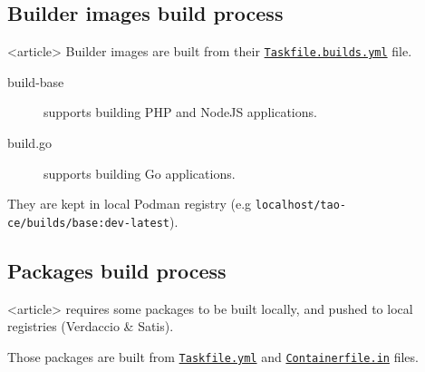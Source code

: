 \subsection<article>{Builder images build process}
\begin{frame}<article>
    Builder images are built from their \href{https://github.com/tao-ce/tao-ce/blob/main/build/Taskfile.builds.yml}{\texttt{Taskfile.builds.yml}} file.

    \begin{description}
\item[build-base] supports building PHP and NodeJS applications.
\item[build.go] supports building Go applications.
    \end{description}

    They are kept in local \alert{Podman} registry (e.g \texttt{\scriptsize localhost/tao-ce/builds/base:dev-latest}).
\end{frame}

\subsection<article>{Packages build process}
\begin{frame}<article>
    \taoce requires some packages to be built locally, and pushed to local registries (Verdaccio \& Satis).

    Those packages are built from \href{https://github.com/tao-ce/tao-ce/blob/main/packages/Taskfile.yml}{\texttt{Taskfile.yml}} and \href{https://github.com/tao-ce/tao-ce/blob/main/packages/Containerfile.in}{\texttt{Containerfile.in}} files.
\end{frame}

